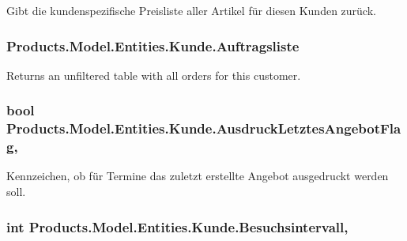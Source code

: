 Gibt die kundenspezifische Preisliste aller Artikel für diesen Kunden zurück. 

\subsubsection[{\texorpdfstring{Auftragsliste}{Auftragsliste}}]{ Products.\+Model.\+Entities.\+Kunde.\+Auftragsliste\hspace{0.3cm}{\ttfamily [get]}}\hypertarget{class_products_1_1_model_1_1_entities_1_1_kunde_a8f1621a1b3b645252bde29488a18eccd}{}\label{class_products_1_1_model_1_1_entities_1_1_kunde_a8f1621a1b3b645252bde29488a18eccd}


Returns an unfiltered table with all orders for this customer. 

\subsubsection[{\texorpdfstring{Ausdruck\+Letztes\+Angebot\+Flag}{AusdruckLetztesAngebotFlag}}]{\setlength{\rightskip}{0pt plus 5cm}bool Products.\+Model.\+Entities.\+Kunde.\+Ausdruck\+Letztes\+Angebot\+Flag\hspace{0.3cm}{\ttfamily [get]}, {\ttfamily [set]}}\hypertarget{class_products_1_1_model_1_1_entities_1_1_kunde_a02a8dffa9aeb939bed01620606e4062c}{}\label{class_products_1_1_model_1_1_entities_1_1_kunde_a02a8dffa9aeb939bed01620606e4062c}


Kennzeichen, ob für Termine das zuletzt erstellte Angebot ausgedruckt werden soll. 

\subsubsection[{\texorpdfstring{Besuchsintervall}{Besuchsintervall}}]{\setlength{\rightskip}{0pt plus 5cm}int Products.\+Model.\+Entities.\+Kunde.\+Besuchsintervall\hspace{0.3cm}{\ttfamily [get]}, {\ttfamily [set]}}\hypertarget{class_products_1_1_model_1_1_entities_1_1_kunde_a59788f52a115d0a11df21499dd7214c0}{}\label{class_products_1_1_model_1_1_entities_1_1_kunde_a59788f52a115d0a11df21499dd7214c0}


